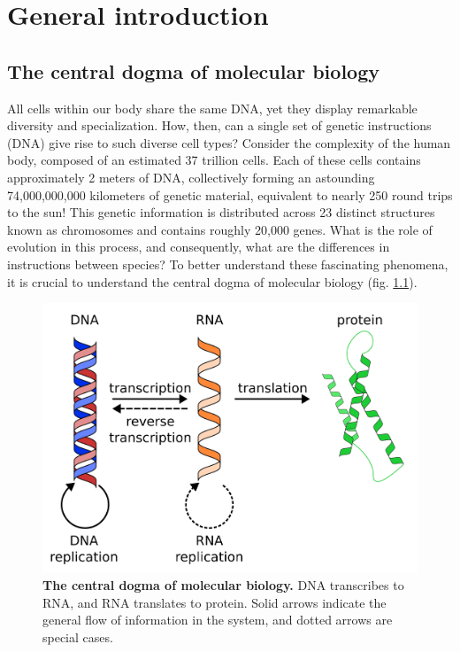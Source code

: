 \chapter{General introduction}\thumbforchapter
\newpage

\section{The central dogma of molecular biology}

All cells within our body share the same DNA, yet they display remarkable diversity and specialization. How, then, can a single set of genetic instructions (DNA) give rise to such diverse cell types? Consider the complexity of the human body, composed of an estimated 37 trillion cells\cite{Bianconi2013}. Each of these cells contains approximately 2 meters of DNA, collectively forming an astounding 74,000,000,000 kilometers of genetic material, equivalent to nearly 250 round trips to the sun! This genetic information is distributed across 23 distinct structures known as chromosomes and contains roughly 20,000 genes. What is the role of evolution in this process, and consequently, what are the differences in instructions between species? To better understand these fascinating phenomena, it is crucial to understand the central dogma of molecular biology (fig. \ref{fig:central_dogma}).

\begin{figure}[H]
    \center
    \includegraphics[width=0.7\linewidth]{ch.introduction/imgs/central_dogma.png}
    \caption{\textbf{The central dogma of molecular biology.} DNA transcribes to RNA, and RNA translates to protein. Solid arrows indicate the general flow of information in the system, and dotted arrows are special cases.}
    \label{fig:central_dogma}
\end{figure}

